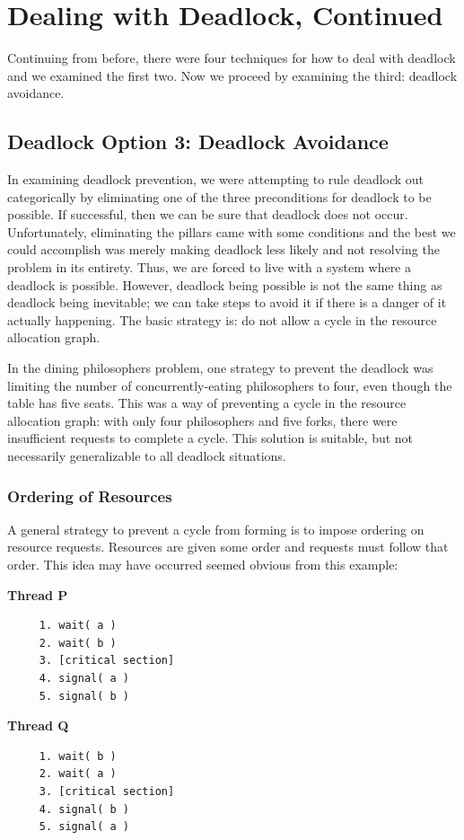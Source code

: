 




\section*{Dealing with Deadlock, Continued}
Continuing from before, there were four techniques for how to deal with deadlock and we examined the first two. Now we proceed by examining the third: deadlock avoidance.

\subsection*{Deadlock Option 3: Deadlock Avoidance}
In examining deadlock prevention, we were attempting to rule deadlock out categorically by eliminating one of the three preconditions for deadlock to be possible. If successful, then we can be sure that deadlock does not occur. Unfortunately, eliminating the pillars came with some conditions and the best we could accomplish was merely making deadlock less likely and not resolving the problem in its entirety. Thus, we are forced to live with a system where a deadlock is possible. However, deadlock being possible is not the same thing as deadlock being inevitable; we can take steps to avoid it if there is a danger of it actually happening. The basic strategy is: do not allow a cycle in the resource allocation graph.

In the dining philosophers problem, one strategy to prevent the deadlock was limiting the number of concurrently-eating philosophers to four, even though the table has five seats. This was a way of preventing a cycle in the resource allocation graph: with only four philosophers and five forks, there were insufficient requests to complete a cycle. This solution is suitable, but not necessarily generalizable to all deadlock situations.

\subsubsection*{Ordering of Resources}
A general strategy to prevent a cycle from forming is to impose ordering on resource requests. Resources are given some order and requests must follow that order. This idea may have occurred seemed obvious from this example: 

\begin{multicols}{2}
\textbf{Thread P}\vspace{-2em}
  \begin{verbatim}
	 1. wait( a ) 
	 2. wait( b )
	 3. [critical section]
	 4. signal( a )
	 5. signal( b )
  \end{verbatim}
\columnbreak
\textbf{Thread Q}\vspace{-2em}
  \begin{verbatim}
	 1. wait( b ) 
	 2. wait( a )
	 3. [critical section]
	 4. signal( b )
	 5. signal( a )
  \end{verbatim}
\end{multicols}
\vspace{-2em}

